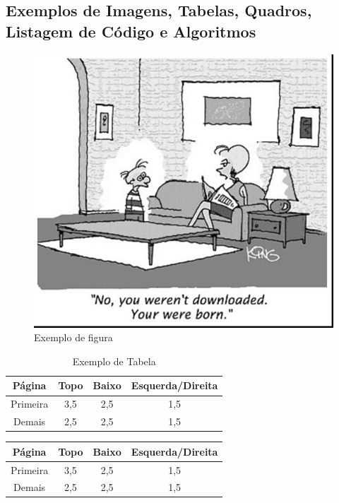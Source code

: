 \subsection{Exemplos de Imagens, Tabelas, Quadros, Listagem de Código e Algoritmos}

\begin{figure}[!h]
    \centering
    \caption{Exemplo de figura}\label{fig:exemplo_figura}
    \includegraphics[width=.38\textwidth]{conteudo/figs/fig1.jpg}
\end{figure}

\newpage

\begin{table}[!h]
    \centering
    \caption{Exemplo de Tabela}\label{tb:exemplo_tabela}
    \begin{tabular}{cccc}
        \hline Página & Topo & Baixo & Esquerda/Direita \\\hline
        Primeira & 3,5 & 2,5 & 1,5 \\
        Demais & 2,5 & 2,5 & 1,5 \\ \hline
    \end{tabular}
    \vspace{0.1cm}
\end{table}

\begin{quadro}[!h]
    \centering
    \caption{Exemplo de Quadro}\label{tb:exemplo_quadro}
    \begin{tabular}{|c|c|c|c|}
        \hline Página & Topo & Baixo & Esquerda/Direita \\\hline
        Primeira & 3,5 & 2,5 & 1,5 \\ \hline
        Demais & 2,5 & 2,5 & 1,5 \\ \hline
    \end{tabular}
    \vspace{0.1cm}
    \vspace{0.1cm}
\end{quadro}

